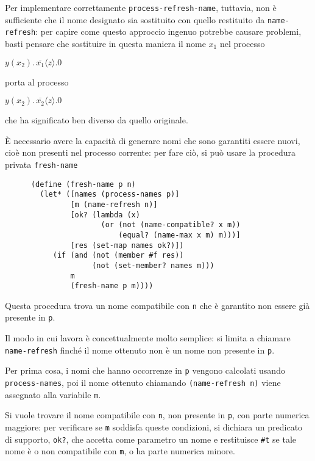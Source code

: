Per implementare correttamente \lstinline{process-refresh-name}, tuttavia,
non \`e sufficiente che il nome designato sia sostituito con quello
restituito da \lstinline{name-refresh}: per capire come questo approccio
ingenuo potrebbe causare problemi, basti pensare che sostituire in questa
maniera il nome $x_1$ nel processo

\begin{pilisting}
$
    y(x_2) . \, \overline{x_1}\langle z\rangle . 0
$
\end{pilisting}

porta al processo

\begin{pilisting}
$
    y(x_2) . \, \overline{x_2}\langle z\rangle . 0
$
\end{pilisting}

che ha significato ben diverso da quello originale.

\`E necessario avere la capacit\`a di generare nomi che sono garantiti
essere nuovi, cio\`e non presenti nel processo corrente: per fare ci\`o, si
pu\`o usare la procedura privata \lstinline{fresh-name}

\begin{lstlisting}
      (define (fresh-name p n)
        (let* ([names (process-names p)]
               [m (name-refresh n)]
               [ok? (lambda (x)
                      (or (not (name-compatible? x m))
                          (equal? (name-max x m) m)))]
               [res (set-map names ok?)])
           (if (and (not (member #f res))
                    (not (set-member? names m)))
               m
               (fresh-name p m))))
\end{lstlisting}

Questa procedura trova un nome compatibile con \lstinline{n} che \`e
garantito non essere gi\`a presente in \lstinline{p}.

Il modo in cui lavora \`e concettualmente molto semplice: si limita a
chiamare \lstinline{name-refresh} finch\'e il nome ottenuto non \`e
un nome non presente in \lstinline{p}.

Per prima cosa, i nomi che hanno occorrenze in \lstinline{p} vengono
calcolati usando \lstinline{process-names}, poi il nome ottenuto chiamando
\lstinline{(name-refresh n)} viene assegnato alla variabile \lstinline{m}.

Si vuole trovare il nome compatibile con \lstinline{n}, non presente in
\lstinline{p}, con parte numerica maggiore: per verificare se
\lstinline{m} soddisfa queste condizioni, si dichiara un predicato di
supporto, \lstinline{ok?}, che accetta come parametro un nome e restituisce
\lstinline{#t} se tale nome \`e o non compatibile con \lstinline{m}, o ha
parte numerica minore.

